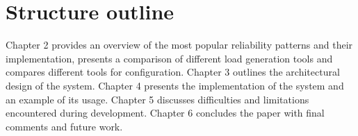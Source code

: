 \section{Structure outline}\label{sec:structure-outline}
Chapter 2 provides an overview of the most popular reliability patterns and their implementation, presents a comparison of different load generation tools and compares different tools for configuration. Chapter 3 outlines the architectural design of the system. Chapter 4 presents the implementation of the system and an example of its usage. Chapter 5 discusses difficulties and limitations encountered during development. Chapter 6 concludes the paper with final comments and future work.